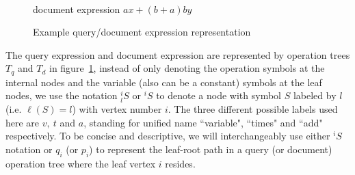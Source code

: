 \begin{figure}
\begin{minipage}[b]{2.65in}
\begin{center}
{
} 
\\[5mm]
document expression $ax + (b+a)by$
\end{center}
\end{minipage}
\caption{Example query/document expression representation}\label{expGraph}
\end{figure}

The query expression and document expression are represented by operation trees $T_q$ and $T_d$ in figure~\ref{expGraph}, 
instead of only denoting the operation symbols at the internal nodes and the variable (also can be a constant) symbols at the leaf nodes, we use the notation $^i_l S$ or $^i S$ to denote a node with symbol $S$ labeled by $l$ (i.e. $\ell(S)=l$) with vertex number $i$. 
The three different possible labels used here are $v,\ t$ and $a$, standing for unified name ``variable", ``times" and ``add" respectively.
To be concise and descriptive, we will interchangeably use either $^i S$ notation or $q_i$ (or $p_i$) to represent the leaf-root path in a query (or document) operation tree where the leaf vertex $i$ resides.

